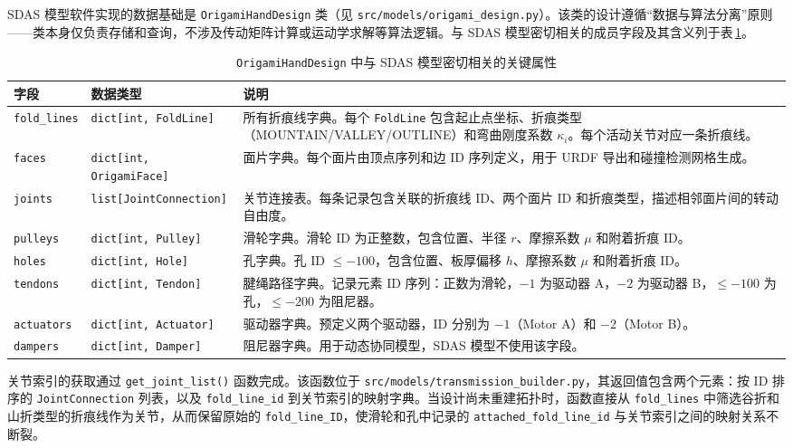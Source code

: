 SDAS 模型软件实现的数据基础是 \verb|OrigamiHandDesign| 类（见 \verb|src/models/origami_design.py|）。该类的设计遵循``数据与算法分离''原则——类本身仅负责存储和查询，不涉及传动矩阵计算或运动学求解等算法逻辑。与 SDAS 模型密切相关的成员字段及其含义列于表\,\ref{tab:design_fields}。

\begin{table}[htbp]
\centering
\caption{\texttt{OrigamiHandDesign} 中与 SDAS 模型密切相关的关键属性}
\label{tab:design_fields}
\small
\begin{tabular}{@{}p{2.6cm}p{2.8cm}p{8.0cm}@{}}
\toprule
\textbf{字段} & \textbf{数据类型} & \textbf{说明} \\
\midrule
\verb|fold_lines| & \verb|dict[int, FoldLine]| & 所有折痕线字典。每个 \verb|FoldLine| 包含起止点坐标、折痕类型
（MOUNTAIN/VALLEY/OUTLINE）和弯曲刚度系数 $\kappa_i$。每个活动关节对应一条折痕线。\\
\verb|faces| & \verb|dict[int, OrigamiFace]| & 面片字典。每个面片由顶点序列和边 ID 序列定义，用于 URDF 导出和碰撞检测网格生成。\\
\verb|joints| & \verb|list[JointConnection]| & 关节连接表。每条记录包含关联的折痕线 ID、两个面片 ID 和折痕类型，描述相邻面片间的转动自由度。\\
\verb|pulleys| & \verb|dict[int, Pulley]| & 滑轮字典。滑轮 ID 为正整数，包含位置、半径 $r$、摩擦系数 $\mu$ 和附着折痕 ID。\\
\verb|holes| & \verb|dict[int, Hole]| & 孔字典。孔 ID $\le -100$，包含位置、板厚偏移 $h$、摩擦系数 $\mu$ 和附着折痕 ID。\\
\verb|tendons| & \verb|dict[int, Tendon]| & 腱绳路径字典。记录元素 ID 序列：正数为滑轮，$-1$ 为驱动器 A，$-2$ 为驱动器 B，$\le -100$ 为孔，$\le -200$ 为阻尼器。\\
\verb|actuators| & \verb|dict[int, Actuator]| & 驱动器字典。预定义两个驱动器，ID 分别为 $-1$（Motor A）和 $-2$（Motor B）。\\
\verb|dampers| & \verb|dict[int, Damper]| & 阻尼器字典。用于动态协同模型，SDAS 模型不使用该字段。\\
\bottomrule
\end{tabular}
\end{table}

关节索引的获取通过 \verb|get_joint_list()| 函数完成。该函数位于 \verb|src/models/transmission_builder.py|，其返回值包含两个元素：按 ID 排序的 \verb|JointConnection| 列表，以及 \verb|fold_line_id| 到关节索引的映射字典。当设计尚未重建拓扑时，函数直接从 \verb|fold_lines| 中筛选谷折和山折类型的折痕线作为关节，从而保留原始的 \verb|fold_line_ID|，使滑轮和孔中记录的 \verb|attached_fold_line_id| 与关节索引之间的映射关系不断裂。

